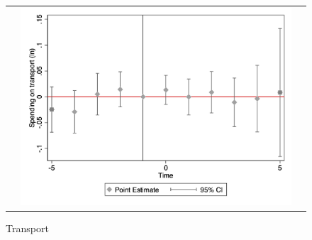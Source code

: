\begin{figure}[!ht]
\begin{tabular}{@{}ccc@{}}
\begin{minipage}[t]{0.32\textwidth}
            \label{fig:cassport}
        \end{minipage} &
        \begin{minipage}[t]{0.32\textwidth}
            \centering
            \caption{Transport}
            \includegraphics[width=\linewidth]{images/total population/caseventdd_ln_q4_08_step1.jpg}
            \label{fig:castransport}
        \end{minipage} \\[10pt]


\end{tabular}
\end{figure}
